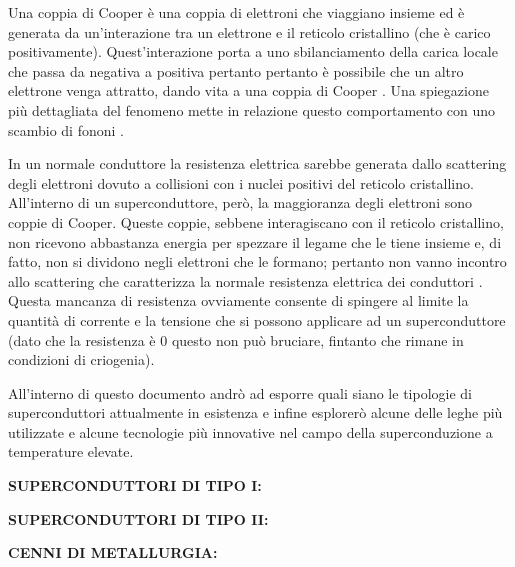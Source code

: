\documentclass[a4paper,10pt]{article}
\begin{document}
Una coppia di Cooper è una coppia di elettroni che viaggiano insieme ed è generata da un'interazione
tra un elettrone e il reticolo cristallino (che è carico positivamente). Quest'interazione porta a
uno sbilanciamento della carica locale che passa da negativa a positiva pertanto pertanto è
possibile che un altro elettrone venga attratto, dando vita a una coppia di Cooper \cite{cooper-cambridge}. Una spiegazione più dettagliata del fenomeno mette in relazione questo comportamento con uno scambio di fononi \cite{quantum-springer}.

In un normale conduttore la resistenza elettrica sarebbe generata dallo scattering degli elettroni dovuto a collisioni con i nuclei positivi del reticolo cristallino. All'interno di un superconduttore, però, la maggioranza degli elettroni sono coppie di Cooper. Queste coppie, sebbene
interagiscano con il reticolo cristallino, non ricevono abbastanza energia per spezzare il legame che le tiene insieme e, di fatto, non si dividono negli elettroni che le formano; pertanto non vanno
incontro allo scattering che caratterizza la normale resistenza elettrica dei conduttori \cite{bcs-cambridge}. Questa mancanza di resistenza ovviamente consente di spingere al limite la quantità di corrente e la tensione che si possono applicare ad un superconduttore (dato che la resistenza è $0$ questo non può bruciare, fintanto che rimane in condizioni di criogenia).

All'interno di questo documento andrò ad esporre quali siano le tipologie di superconduttori attualmente in esistenza e infine esplorerò alcune delle leghe più utilizzate e alcune tecnologie più innovative nel campo della superconduzione a temperature elevate.

\bigskip
{}
\makeatletter{}\makeatother
\label{sec:quench}
\noindent
\textbf{SUPERCONDUTTORI DI TIPO I:}

\bigskip
{}
\makeatletter{}\makeatother
\label{sec:mariotto}
\noindent
\textbf{SUPERCONDUTTORI DI TIPO II:}

\bigskip
{}
\makeatletter{}\makeatother
\label{sec:mariotto}
\noindent
\textbf{CENNI DI METALLURGIA:}



\clearpage
\end{document}
